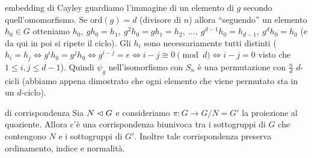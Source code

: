 \begin{observation}{embedding di Cayley}
    guardiamo l'immagine di un elemento di $g$ secondo quell'omomorfismo. Se $\text{ord}(g) = d$ (divisore di $n$) allora ``seguendo'' un elemento $h_0 \in G$ otteniamo $h_0, \ gh_0=h_1, \ g^2h_0 = gh_1=h_2, \ \dots , \ g^{d-1}h_0 = h_{d-1}, \ g^dh_0 = h_0$ (e da qui in poi si ripete il ciclo). Gli $h_i$ sono necessariamente tutti distinti ($h_i = h_j \iff g^ih_0= g^jh_0 \iff g^{i-j} = e \iff i-j \cong 0 \pmod{d} \iff i-j = 0$ visto che $1 \leq i,j\leq d-1$).
    Quindi $\psi_g$ nell'isomorfismo con $S_n$ è una permutazione con $\frac{n}{d}$ $d$-cicli (abbiamo appena dimostrato che ogni elemento che viene permutato sta in un $d$-ciclo).
\end{observation}
\begin{theorem}{di corrispondenza}
    Sia $N \vartriangleleft G$ e consideriamo $\pi : G \rightarrow G/N = G'$ la proiezione al quoziente. Allora c'è una corrispondenza biunivoca tra i sottogruppi di $G$ che contengono $N$ e i sottogruppi di $G'$. Inoltre tale corrispondenza preserva ordinamento, indice e normalità. 
\end{theorem}
